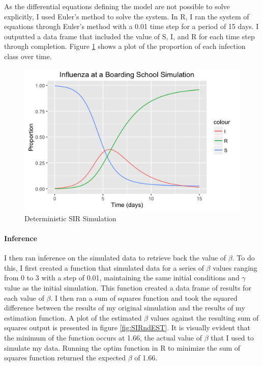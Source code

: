 \documentclass{article}
\begin{document}
As the differential equations defining the model are not possible to solve explicitly, I used Euler's method to solve the system. In R, I ran the system of equations through Euler's method with a 0.01 time step for a period of 15 days. I outputted a data frame that included the value of S, I, and R for each time step through completion. Figure \ref{fig:SIRndSim} shows a plot of the proportion of each infection class over time. 
 
 \begin{figure}[h]
 \includegraphics[scale=.5, outer]{SIRndSim.png}
 \caption{Deterministic SIR Simulation}
 \label{fig:SIRndSim}
 \end{figure}

\paragraph{Inference}
I then ran inference on the simulated data to retrieve back the value of $\beta$. To do this, I first created a function that simulated data for a series of $\beta$ values ranging from 0 to 3 with a step of 0.01, maintaining the same initial conditions and $\gamma$ value as the initial simulation. This function created a data frame of results for each value of $\beta$. I then ran a sum of squares function and took the squared difference between the results of my original simulation and the results of my estimation function. A plot of the estimated $\beta$ values against the resulting sum of squares output is presented in figure \ref{fig:SIRndEST}. It is visually evident that the minimum of the function occurs at 1.66, the actual value of $\beta$ that I used to simulate my data. Running the optim function in R to minimize the sum of squares function returned the expected $\beta$ of 1.66. 
\end{document}
